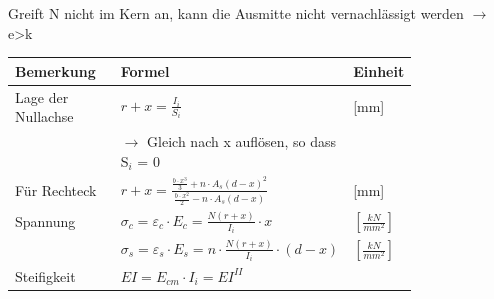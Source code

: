 \begin{multicols}{2}
	Greift N nicht im Kern an, kann die Ausmitte nicht vernachlässigt werden $ \rightarrow $ e>k
	
	\begin{tabular}{p{0.3\linewidth}|p{0.5\linewidth}|l}
		
		Bemerkung		& Formel		& Einheit \\ \hline
		
		
		Lage der Nullachse & $ r + x = \frac{I_i}{S_i} $	& [mm] \\
			&  $ \rightarrow $ Gleich nach x auflösen, so dass S$_i$ = 0	& 	\\		
		
		Für Rechteck	& $ r + x = \frac{  \frac{b \cdot x^3}{3}  + n \cdot A_s ( d - x )^2  }{  \frac{b \cdot x^2}{2} - n \cdot A_s ( d -  x )  } $	&	[mm] \\
		
		Spannung		& $ \sigma_c = \varepsilon_c \cdot E_c = \frac{ N ( r + x ) }{I_i} \cdot x $	& $ \left[ \frac{kN}{mm^2}\right] $ \\
		& $ \sigma_s = \varepsilon_s \cdot E_s = n \cdot \frac{ N ( r + x ) }{I_i} \cdot (d - x) $	& $ \left[ \frac{kN}{mm^2}\right] $ \\	
		Steifigkeit		& $ EI = E_{cm} \cdot I_i = EI^{II} $	&	\\
		
	\end{tabular}
	
	
\end{multicols}